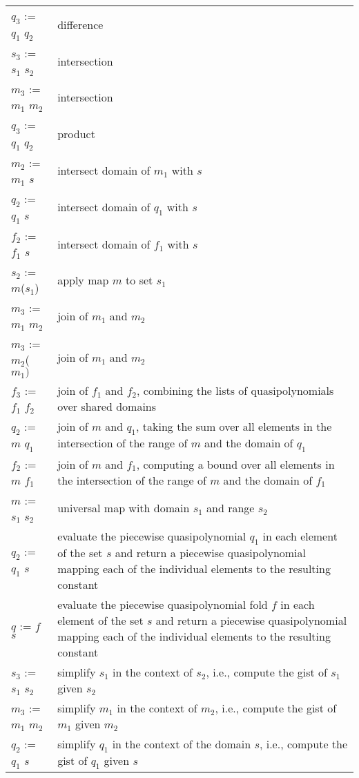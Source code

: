 \begin{supertabular}{lp{0.7\textwidth}}
$q_3$ := $q_1$ \ai{$-$} $q_2$ & difference
\\
$s_3$ := $s_1$ \ai{$*$} $s_2$ & intersection
\\
$m_3$ := $m_1$ \ai{$*$} $m_2$ & intersection
\\
$q_3$ := $q_1$ \ai{$*$} $q_2$ & product
\\
$m_2$ := $m_1$ \ai{$*$} $s$ & intersect domain of $m_1$ with $s$
\\
$q_2$ := $q_1$ \ai{$*$} $s$ & intersect domain of $q_1$ with $s$
\\
$f_2$ := $f_1$ \ai{$*$} $s$ & intersect domain of $f_1$ with $s$
\\
$s_2$ := $m$($s_1$) & apply map $m$ to set $s_1$
\\
$m_3$ := $m_1$  $m_2$ & join of $m_1$ and $m_2$
\\
$m_3$ := $m_2$($m_1)$ & join of $m_1$ and $m_2$
\\
$f_3$ := $f_1$  $f_2$ & join of $f_1$ and $f_2$, combining
the lists of quasipolynomials over shared domains
\\
$q_2$ := $m$  $q_1$ & join of $m$ and $q_1$, taking the sum
over all elements in the intersection of the range of $m$ and the domain
of $q_1$
\\
$f_2$ := $m$  $f_1$ & join of $m$ and $f_1$, computing a bound
over all elements in the intersection of the range of $m$ and the domain
of $f_1$
\\
$m$ := $s_1$ \ai[\tt]{->} $s_2$ & universal map with domain $s_1$
and range $s_2$
\\
$q_2$ := $q_1$  $s$ &
evaluate the piecewise quasipolynomial $q_1$ in each element
of the set $s$ and return a piecewise quasipolynomial
mapping each of the individual elements to the resulting
constant
\\
$q$ := $f$  $s$ &
evaluate the piecewise quasipolynomial fold $f$ in each element
of the set $s$ and return a piecewise quasipolynomial
mapping each of the individual elements to the resulting
constant
\\
$s_3$ := $s_1$ \ai[\tt]{\%} $s_2$ &
simplify $s_1$ in the context of $s_2$, i.e., compute
the gist of $s_1$ given $s_2$
\\
$m_3$ := $m_1$ \ai[\tt]{\%} $m_2$ &
simplify $m_1$ in the context of $m_2$, i.e., compute
the gist of $m_1$ given $m_2$
\\
$q_2$ := $q_1$ \ai[\tt]{\%} $s$ &
simplify $q_1$ in the context of the domain $s$, i.e., compute
the gist of $q_1$ given $s$
\\

\end{supertabular}
